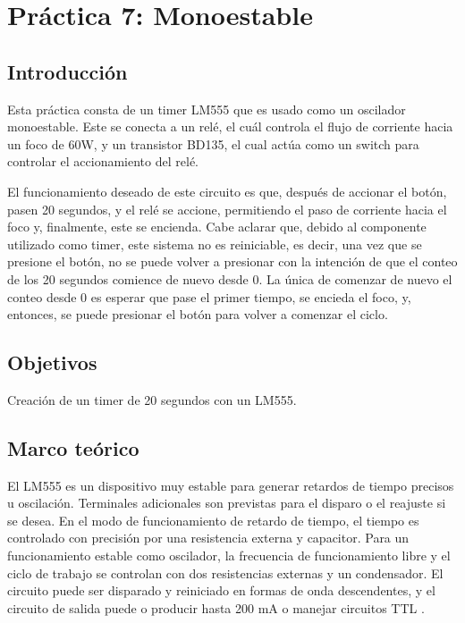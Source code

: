 \section{Práctica 7: Monoestable}

\subsection{Introducción}

Esta práctica consta de un timer LM555 que es usado como un oscilador monoestable. Este se conecta a un relé, el cuál controla el flujo de corriente hacia un foco de 60W, y un transistor BD135, el cual actúa como un switch para controlar el accionamiento del relé.

El funcionamiento deseado de este circuito es que, después de accionar el botón, pasen 20 segundos, y el relé se accione, permitiendo el paso de corriente hacia el foco y, finalmente, este se encienda. Cabe aclarar que, debido al componente utilizado como timer, este sistema no es reiniciable, es decir, una vez que se presione el botón, no se puede volver a presionar con la intención de que el conteo de los 20 segundos comience de nuevo desde 0. La única de comenzar de nuevo el conteo desde 0 es esperar que pase el primer tiempo, se encieda el foco, y, entonces, se puede presionar el botón para volver a comenzar el ciclo.

\subsection{Objetivos}

Creación de un timer de 20 segundos con un LM555.

\subsection{Marco teórico}

El LM555 es un dispositivo muy estable para generar retardos de tiempo precisos u oscilación. Terminales adicionales son previstas para el disparo o el reajuste si se desea. En el modo de funcionamiento de retardo de tiempo, el tiempo es controlado con precisión por una resistencia externa y capacitor. Para un funcionamiento estable como oscilador, la frecuencia de funcionamiento libre y el ciclo de trabajo se controlan con dos resistencias externas y un condensador. El circuito puede ser disparado y reiniciado en formas de onda descendentes, y el circuito de salida puede o producir hasta 200 mA o manejar circuitos TTL \parencite{texas_instruments_lm555_2015}.

